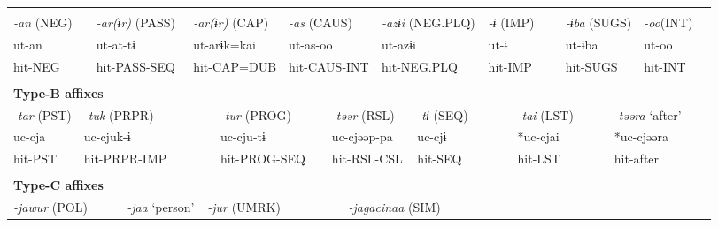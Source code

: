 \tabletail{}
\tablelasttail{}
\begin{tabularx}{\textwidth}{XXm{}XXXXXXXXXXXXXXXXXXXX}
\lsptoprule
\multicolumn{23}{X}{{\bfseries Type-A affixes}}\\
\multicolumn{3}{X}{{ \textit{{}-an} (NEG)}} & \multicolumn{3}{X}{{ \textit{{}-ar(ɨr)} (PASS)}} & \multicolumn{4}{X}{{ \textit{{}-ar(ɨr)} (CAP)}} & \multicolumn{4}{X}{{ \textit{{}-as} (CAUS)}} & \multicolumn{3}{X}{{ \textit{{}-azɨi} (NEG.PLQ)}} & \multicolumn{2}{X}{{ \textit{{}-ɨ} (IMP)}} & \multicolumn{2}{X}{{ \textit{{}-ɨba} (SUGS)}} & { \textit{{}-oo}(INT)} & \\
\multicolumn{3}{X}{{ ut-an}} & \multicolumn{3}{X}{{ ut-at-tɨ}} & \multicolumn{4}{X}{{ ut-arɨk=kai}} & \multicolumn{4}{X}{{ ut-as-oo}} & \multicolumn{3}{X}{{ ut-azɨi}} & \multicolumn{2}{X}{{ ut-ɨ}} & \multicolumn{2}{X}{{ ut-ɨba}} & { ut-oo} & \\
\multicolumn{3}{X}{hit-NEG} & \multicolumn{3}{X}{hit-PASS-SEQ} & \multicolumn{4}{X}{hit-CAP=DUB} & \multicolumn{4}{X}{hit-CAUS-INT} & \multicolumn{3}{X}{hit-NEG.PLQ} & \multicolumn{2}{X}{hit-IMP} & \multicolumn{2}{X}{hit-SUGS} & hit-INT & \\
\multicolumn{23}{X}{}\\
\multicolumn{23}{X}{{\bfseries Type-B affixes}}\\
\multicolumn{2}{X}{{ \textit{{}-tar} (PST)}} & \multicolumn{6}{X}{{ \textit{{}-tuk} (PRPR)}} & \multicolumn{3}{X}{{ \textit{{}-tur} (PROG)}} & \multicolumn{4}{X}{{ \textit{{}-təər} (RSL)}} & \multicolumn{3}{X}{{ \textit{{}-tɨ} (SEQ)}} & \multicolumn{2}{X}{{ \textit{{}-tai} (LST)}} & \multicolumn{3}{X}{{ \textit{{}-təəra} ‘after’}}\\
\multicolumn{2}{X}{{ uc-cja}} & \multicolumn{6}{X}{{ uc-cjuk-ɨ}} & \multicolumn{3}{X}{{ uc-cju-tɨ}} & \multicolumn{4}{X}{{ uc-cjəəp-pa}} & \multicolumn{3}{X}{{ uc-cjɨ}} & \multicolumn{2}{X}{{ *uc-cjai}} & \multicolumn{3}{X}{{ *uc-cjəəra}}\\
\multicolumn{2}{X}{hit-PST} & \multicolumn{6}{X}{hit-PRPR-IMP} & \multicolumn{3}{X}{hit-PROG-SEQ} & \multicolumn{4}{X}{hit-RSL-CSL} & \multicolumn{3}{X}{hit-SEQ} & \multicolumn{2}{X}{hit-LST} & \multicolumn{3}{X}{{ hit-after}}\\
\multicolumn{2}{X}{} & \multicolumn{6}{X}{} & \multicolumn{3}{X}{} & \multicolumn{4}{X}{} & \multicolumn{3}{X}{} & \multicolumn{2}{X}{} & \multicolumn{3}{X}{}\\
\multicolumn{23}{X}{{\bfseries Type-C affixes}}\\
\multicolumn{4}{X}{{ \textit{{}-jawur} (POL)}} & \multicolumn{3}{X}{{ \textit{{}-jaa} ‘person’}} & \multicolumn{5}{X}{{ \textit{{}-jur} (UMRK)}} & \multicolumn{4}{X}{{ \textit{{}-jagacinaa} (SIM)}} & \multicolumn{7}{X}{}\\

\end{tabularx}
